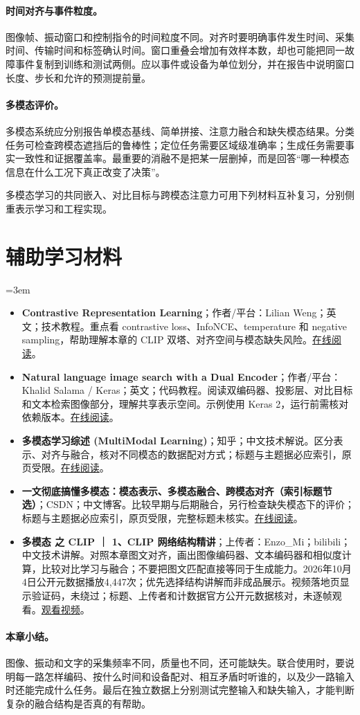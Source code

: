 \paragraph{时间对齐与事件粒度。}
图像帧、振动窗口和控制指令的时间粒度不同。对齐时要明确事件发生时间、采集时间、传输时间和标签确认时间。窗口重叠会增加有效样本数，却也可能把同一故障事件复制到训练和测试两侧。应以事件或设备为单位划分，并在报告中说明窗口长度、步长和允许的预测提前量。

\paragraph{多模态评价。}
多模态系统应分别报告单模态基线、简单拼接、注意力融合和缺失模态结果。分类任务可检查跨模态遮挡后的鲁棒性；定位任务需要区域级准确率；生成任务需要事实一致性和证据覆盖率。最重要的消融不是把某一层删掉，而是回答“哪一种模态信息在什么工况下真正改变了决策”。

多模态学习的共同嵌入、对比目标与跨模态注意力可用下列材料互补复习，分别侧重表示学习和工程实现。
\section*{辅助学习材料}
\begingroup
\emergencystretch=3em
\begin{itemize}
\item \textbf{Contrastive Representation Learning}；作者/平台：Lilian Weng；英文；技术教程。重点看 contrastive loss、InfoNCE、temperature 和 negative sampling，帮助理解本章的 CLIP 双塔、对齐空间与模态缺失风险。\href{https://lilianweng.github.io/posts/2021-05-31-contrastive/}{在线阅读}。
\item \textbf{Natural language image search with a Dual Encoder}；作者/平台：Khalid Salama / Keras；英文；代码教程。阅读双编码器、投影层、对比目标和文本检索图像部分，理解共享表示空间。示例使用 Keras 2，运行前需核对依赖版本。\href{https://keras.io/examples/vision/nl\_image\_search/}{在线阅读}。
\item \textbf{多模态学习综述 (MultiModal Learning)}；知乎；中文技术解说。区分表示、对齐与融合，核对不同模态的数据配对方式；标题与主题据必应索引，原页受限。\href{https://zhuanlan.zhihu.com/p/582878508}{在线阅读}。
\item \textbf{一文彻底搞懂多模态：模态表示、多模态融合、跨模态对齐（索引标题节选）}；CSDN；中文博客。比较早期与后期融合，另行检查缺失模态下的评价；标题与主题据必应索引，原页受限，完整标题未核实。\href{https://blog.csdn.net/star\_nwe/article/details/143416379}{在线阅读}。
\item \textbf{多模态 之 CLIP ｜ 1、CLIP 网络结构精讲}；上传者：Enzo\_Mi；bilibili；中文技术讲解。对照本章图文对齐，画出图像编码器、文本编码器和相似度计算，比较对比学习与融合；不要把图文匹配直接等同于生成能力。2026年10月4日公开元数据播放4,447次；优先选择结构讲解而非成品展示。视频落地页显示验证码，未绕过；标题、上传者和计数据官方公开元数据核对，未逐帧观看。\href{https://www.bilibili.com/video/BV1BeZFBGEhe/}{观看视频}。
\end{itemize}
\endgroup
\paragraph{本章小结。}
图像、振动和文字的采集频率不同，质量也不同，还可能缺失。联合使用时，要说明每一路怎样编码、按什么时间和设备配对、相互矛盾时听谁的，以及少一路输入时还能完成什么任务。最后在独立数据上分别测试完整输入和缺失输入，才能判断复杂的融合结构是否真的有帮助。
